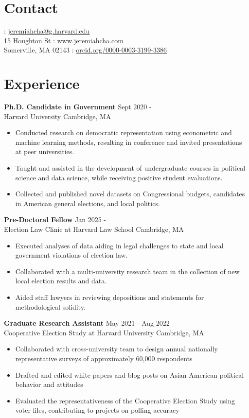 \documentclass[margin, line]{res}
\begin{document}
\begin{resume}

\section{Contact}
\mbox{} \hfill \Letter: \href{mailto:jeremiahcha@g.harvard.edu}{jeremiahcha@g.harvard.edu}\\
15 Houghton St \hfill \Mundus: \href{httsp://www.jeremiahcha.com}{www.jeremiahcha.com}\\
Somerville, MA 02143 \hfill \Mundus: \href{https://orcid.org/0000-0003-3199-3386}{orcid.org/0000-0003-3199-3386}

\section{Experience}
\textbf{Ph.D. Candidate in Government} \hfill Sept 2020 - \\
Harvard University \hfill Cambridge, MA
\begin{itemize}
	\item Conducted research on democratic representation using econometric and machine learning methods, resulting in conference and invited presentations at peer universities.
	\item Taught and assisted in the development of undergraduate courses in political science and data science, while receiving positive student evaluations.
	\item Collected and published novel datasets on Congressional budgets, candidates in American general elections, and local politics.
\end{itemize}

\textbf{Pre-Doctoral Fellow} \hfill Jan 2025 -  \\
Election Law Clinic at Harvard Law School \hfill Cambridge, MA
\begin{itemize}
	\item Executed analyses of data aiding in legal challenges to state and local government violations of election law.
	\item Collaborated with a multi-university research team in the collection of new local election results and data. 
	\item Aided staff lawyers in reviewing depositions and statements for methodological solidity.  
\end{itemize}

\textbf{Graduate Research Assistant} \hfill May 2021 - Aug 2022 \\
Cooperative Election Study at Harvard University \hfill Cambridge, MA
\begin{itemize}
	\item Collaborated with cross-university team to design annual nationally representative surveys of approximately 60,000 respondents
	\item Drafted and edited white papers and blog posts on Asian American political behavior and attitudes 
	\item Evaluated the representativeness of the Cooperative Election Study using voter files, contributing to projects on polling accuracy  
\end{itemize}


\end{resume}
\end{document}
